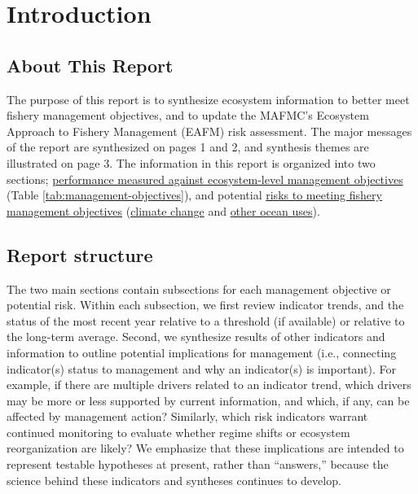 \documentclass[
  10pt,
]{article}
\author{}
\date{\vspace{-2.5em}}
\begin{document}
\setcounter{page}{4}

\hypertarget{introduction}{%
\section{Introduction}\label{introduction}}

\hypertarget{about-this-report}{%
\subsection{About This Report}\label{about-this-report}}

The purpose of this report is to synthesize ecosystem information to
better meet fishery management objectives, and to update the MAFMC's
Ecosystem Approach to Fishery Management (EAFM) risk assessment. The
major messages of the report are synthesized on pages 1 and 2, and
synthesis themes are illustrated on page 3. The information in this
report is organized into two sections;
\protect\hyperlink{performance-relative-to-fishery-management-objectives}{performance
measured against ecosystem-level management objectives} (Table
\ref{tab:management-objectives}), and potential
\protect\hyperlink{risks-to-meeting-fishery-management-objectives}{risks
to meeting fishery management objectives}
(\protect\hyperlink{climate-and-ecosystem-productivity}{climate change}
and \protect\hyperlink{other-ocean-uses:-offshore-wind}{other ocean
uses}).

\hypertarget{report-structure}{%
\subsection{Report structure}\label{report-structure}}

The two main sections contain subsections for each management objective
or potential risk. Within each subsection, we first review indicator
trends, and the status of the most recent year relative to a threshold
(if available) or relative to the long-term average. Second, we
synthesize results of other indicators and information to outline
potential implications for management (i.e., connecting indicator(s)
status to management and why an indicator(s) is important). For example,
if there are multiple drivers related to an indicator trend, which
drivers may be more or less supported by current information, and which,
if any, can be affected by management action? Similarly, which risk
indicators warrant continued monitoring to evaluate whether regime
shifts or ecosystem reorganization are likely? We emphasize that these
implications are intended to represent testable hypotheses at present,
rather than ``answers,'' because the science behind these indicators and
syntheses continues to develop.
\end{document}
